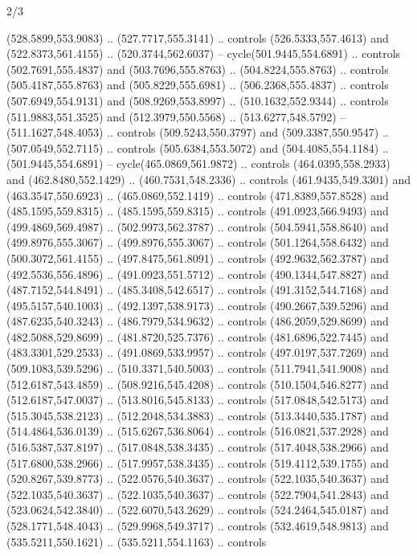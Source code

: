 \begin{flagdescription}{2/3}
\begin{scope}[xshift=0.5\flaglength,yshift=0.5\flagwidth,scale=\flagwidth/525.28]
\begin{scope}[y=0.1mm, x=0.1mm, yscale=-1,shift={(-381.5,-404)}]
\begin{scope}[shift={(5.25001,4.53053)},miter limit=4.00,line width=0.800\lw]
  (528.5899,553.9083) .. (527.7717,555.3141) .. controls (526.5333,557.4613) and
  (522.8373,561.4155) .. (520.3744,562.6037) -- cycle(501.9445,554.6891) ..
  controls (502.7691,555.4837) and (503.7696,555.8763) .. (504.8224,555.8763) ..
  controls (505.4187,555.8763) and (505.8229,555.6981) .. (506.2368,555.4837) ..
  controls (507.6949,554.9131) and (508.9269,553.8997) .. (510.1632,552.9344) ..
  controls (511.9883,551.3525) and (512.3979,550.5568) .. (513.6277,548.5792) --
  (511.1627,548.4053) .. controls (509.5243,550.3797) and (509.3387,550.9547) ..
  (507.0549,552.7115) .. controls (505.6384,553.5072) and (504.4085,554.1184) ..
  (501.9445,554.6891) -- cycle(465.0869,561.9872) .. controls
  (464.0395,558.2933) and (462.8480,552.1429) .. (460.7531,548.2336) .. controls
  (461.9435,549.3301) and (463.3547,550.6923) .. (465.0869,552.1419) .. controls
  (471.8389,557.8528) and (485.1595,559.8315) .. (485.1595,559.8315) .. controls
  (491.0923,566.9493) and (499.4869,569.4987) .. (502.9973,562.3787) .. controls
  (504.5941,558.8640) and (499.8976,555.3067) .. (499.8976,555.3067) .. controls
  (501.1264,558.6432) and (500.3072,561.4155) .. (497.8475,561.8091) .. controls
  (492.9632,562.3787) and (492.5536,556.4896) .. (491.0923,551.5712) .. controls
  (490.1344,547.8827) and (487.7152,544.8491) .. (485.3408,542.6517) .. controls
  (491.3152,544.7168) and (495.5157,540.1003) .. (492.1397,538.9173) .. controls
  (490.2667,539.5296) and (487.6235,540.3243) .. (486.7979,534.9632) .. controls
  (486.2059,529.8699) and (482.5088,529.8699) .. (481.8720,525.7376) .. controls
  (481.6896,522.7445) and (483.3301,529.2533) .. (491.0869,533.9957) .. controls
  (497.0197,537.7269) and (509.1083,539.5296) .. (510.3371,540.5003) .. controls
  (511.7941,541.9008) and (512.6187,543.4859) .. (508.9216,545.4208) .. controls
  (510.1504,546.8277) and (512.6187,547.0037) .. (513.8016,545.8133) .. controls
  (517.0848,542.5173) and (515.3045,538.2123) .. (512.2048,534.3883) .. controls
  (513.3440,535.1787) and (514.4864,536.0139) .. (515.6267,536.8064) .. controls
  (516.0821,537.2928) and (516.5387,537.8197) .. (517.0848,538.3435) .. controls
  (517.4048,538.2966) and (517.6800,538.2966) .. (517.9957,538.3435) .. controls
  (519.4112,539.1755) and (520.8267,539.8773) .. (522.0576,540.3637) .. controls
  (522.1035,540.3637) and (522.1035,540.3637) .. (522.1035,540.3637) .. controls
  (522.7904,541.2843) and (523.0624,542.3840) .. (522.6070,543.2629) .. controls
  (524.2464,545.0187) and (528.1771,548.4043) .. (529.9968,549.3717) .. controls
  (532.4619,548.9813) and (535.5211,550.1621) .. (535.5211,554.1163) .. controls

\end{scope}
\end{scope}
\end{scope}
\end{flagdescription}
